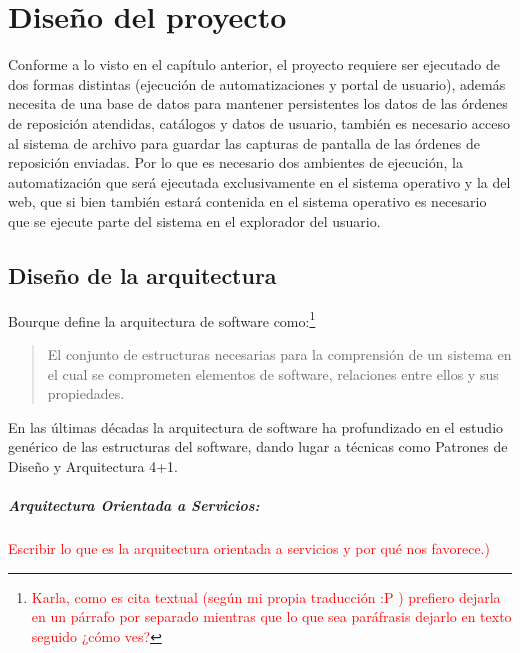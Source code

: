 \chapter{Diseño del proyecto}\label{cap3}
Conforme a lo visto en el capítulo anterior, el proyecto requiere ser ejecutado de dos formas distintas (ejecución de automatizaciones y portal de usuario), además necesita de una base de datos para mantener persistentes los datos de las órdenes de reposición atendidas, catálogos y datos de usuario, también es necesario acceso al sistema de archivo para guardar las capturas de pantalla de las órdenes de reposición enviadas. Por lo que es necesario dos ambientes de ejecución, la automatización que será ejecutada exclusivamente en el sistema operativo y la del web, que si bien también estará contenida en el sistema operativo es necesario que se ejecute parte del sistema en el explorador del usuario.




\section{Diseño de la arquitectura}
Bourque define la arquitectura de software como:\footnote{\textcolor{red}{Karla, como es cita textual (según mi propia traducción :P ) prefiero dejarla en un párrafo por separado mientras que lo que sea paráfrasis dejarlo en texto seguido ¿cómo ves?}}
\begin{quote}
	El conjunto de estructuras necesarias para la comprensión de un sistema en el cual se comprometen elementos de software, relaciones entre ellos y sus propiedades\cite{SWEBOOK}.
\end{quote}
En las últimas décadas la arquitectura de software ha profundizado en el estudio genérico de las estructuras del software, dando lugar a técnicas como Patrones de Diseño y Arquitectura 4+1\cite{SWEBOOK, SoftwareArchitectureInAction}.
\paragraph{Arquitectura Orientada a Servicios:}
\textcolor{red}{Escribir lo que es la arquitectura orientada a servicios y por qué nos favorece.)}
